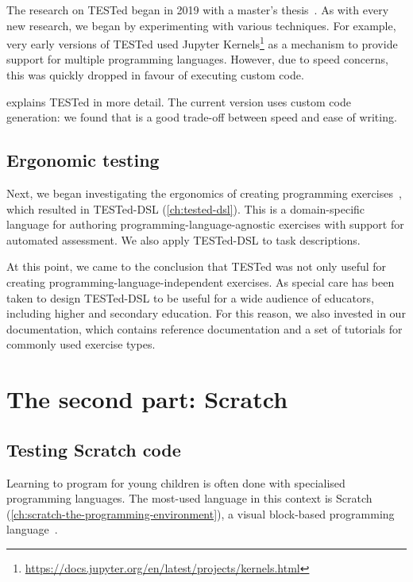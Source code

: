 \documentclass[./main]{subfiles}
\begin{document}
The research on TESTed began in 2019 with a master's thesis~\autocite{strijbolTESTedOneJudge2020}.
As with every new research, we began by experimenting with various techniques.
For example, very early versions of TESTed used Jupyter Kernels\footnote{\url{https://docs.jupyter.org/en/latest/projects/kernels.html}} as a mechanism to provide support for multiple programming languages.
However, due to speed concerns, this was quickly dropped in favour of executing custom code.

 explains TESTed in more detail.
The current version uses custom code generation: we found that is a good trade-off between speed and ease of writing.

\subsection{Ergonomic testing}\label{subsec:ergonomic-testing}

Next, we began investigating the ergonomics of creating programming exercises~\autocite{selsTESTedProgrammeertaalonafhankelijkTesten2021}, which resulted in TESTed-DSL (\cref{ch:tested-dsl}).
This is a domain-specific language for authoring programming-language-agnostic exercises with support for automated assessment.
We also apply TESTed-DSL to task descriptions.

At this point, we came to the conclusion that TESTed was not only useful for creating programming-language-independent exercises.
As special care has been taken to design TESTed-DSL to be useful for a wide audience of educators, including higher and secondary education.
For this reason, we also invested in our documentation, which contains reference documentation and a set of tutorials for commonly used exercise types.

\section{The second part: Scratch}\label{sec:the-second-part:-scratch}

\subsection{Testing Scratch code}\label{subsec:testing-scrath-code}

Learning to program for young children is often done with specialised programming languages.
The most-used language in this context is Scratch (\cref{ch:scratch-the-programming-environment}), a visual block-based programming language~\autocite{resnickScratchProgrammingAll2009}.
\end{document}
